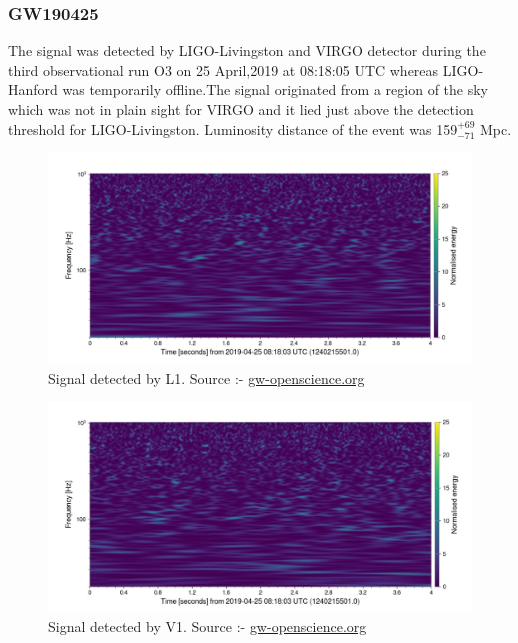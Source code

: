 \pagebreak

\subsubsection{GW190425}
The signal was detected by LIGO-Livingston and VIRGO detector during the third observational run O3 on 25 April,2019 at 08:18:05 UTC whereas LIGO-Hanford was temporarily offline.The signal originated from a region of the sky which was not in plain sight for VIRGO and it lied just above the detection threshold for LIGO-Livingston. Luminosity distance of the event was 159$_{-71}^{+69}$ Mpc. \cite{GW190425_1}

\begin{figure}[htpb]
    \centering
    \includegraphics[scale=0.75]{images.tex/GW190425 L1.jpg}
    \caption{Signal detected by L1. Source :- \href{https://www.gw-openscience.org/eventapi/html/O3_Discovery_Papers/GW190425/v1/}{gw-openscience.org}}
    \end{figure}
    
\begin{figure}[htpb]
    \centering
    \includegraphics[scale=0.75]{images.tex/GW190425 V1.jpg}
    \caption{Signal detected by V1. Source :- \href{https://www.gw-openscience.org/eventapi/html/O3_Discovery_Papers/GW190425/v1/}{gw-openscience.org}}
\end{figure}

